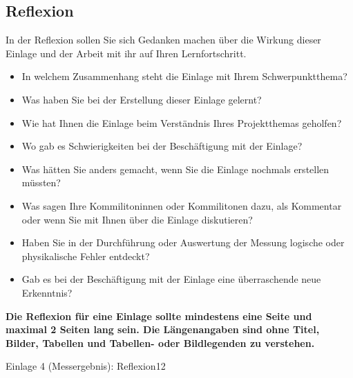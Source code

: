 \subsection{Reflexion}
\begin{hinweise}
In der Reflexion sollen Sie sich Gedanken machen über die Wirkung dieser Einlage und der Arbeit mit ihr auf
Ihren Lernfortschritt.
\begin{itemize}\itemsep0pt
\item In welchem Zusammenhang steht die Einlage mit Ihrem Schwerpunktthema?
\item Was haben Sie bei der Erstellung dieser Einlage gelernt?
\item Wie hat Ihnen die Einlage beim Verständnis Ihres Projektthemas geholfen?
\item Wo gab es Schwierigkeiten bei der Beschäftigung mit der Einlage?
\item Was hätten Sie anders gemacht, wenn Sie die Einlage nochmals erstellen müssten?
\item Was sagen Ihre Kommilitoninnen oder Kommilitonen dazu, als Kommentar oder wenn Sie mit Ihnen über die Einlage diskutieren?
\item Haben Sie in der Durchführung oder Auswertung der Messung logische oder physikalische Fehler entdeckt?
\item Gab es bei der Beschäftigung mit der Einlage eine überraschende neue Erkenntnis?
\end{itemize}
\textbf{Die Reflexion für eine Einlage sollte mindestens eine Seite und maximal 2 Seiten lang sein. Die
Längenangaben sind ohne Titel, Bilder, Tabellen und Tabellen- oder Bildlegenden zu verstehen.}
\end{hinweise}
\begin{umfang}{Einlage 4 (Messergebnis): Reflexion}{1}{2}
\end{umfang}

